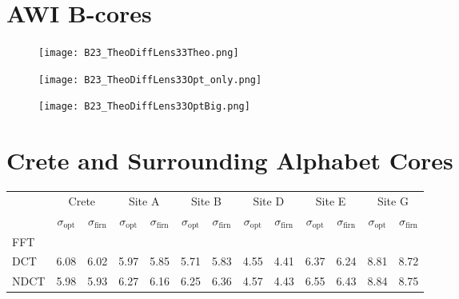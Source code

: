 \documentclass[../../CompleteThesis/Complete_1stDraft]{subfiles}
\begin{document}
\section[AWI B-cores]{AWI B-cores}
\label{Sec:Results_AWIBcores}




\begin{figure}[h]
	\centering
	\texttt{[image: B23\_TheoDiffLens33Theo.png]}
	\caption[]{}
	\label{fig:B23_BD_Theo}
\end{figure}

\begin{figure}[h]
	\centering
	\texttt{[image: B23\_TheoDiffLens33Opt\_only.png]}
	\caption[]{}
	\label{fig:B23_BD_OptOnly}
\end{figure}

\begin{figure}[h]
	\centering
	\texttt{[image: B23\_TheoDiffLens33OptBig.png]}
	\caption[]{}
	\label{fig:B23_BD_OptBig}
\end{figure}











\section[Alphabet Cores]{Crete and Surrounding Alphabet Cores}
\label{Sec:Results_AlphabetCores}

\begin{table}[ht]
	\centering
	\begin{tabular}{l||*{6}{c | c||}}
		&
		\multicolumn{2}{c}{Crete} & \multicolumn{2}{c}{Site A} & \multicolumn{2}{c}{Site B} & \multicolumn{2}{c}{Site D} & \multicolumn{2}{c}{Site E} & \multicolumn{2}{c||}{Site G} \\
		&
		$\sigma_{\text{opt}}$ & $\sigma_{\text{firn}}$ & $\sigma_{\text{opt}}$ & $\sigma_{\text{firn}}$ & $\sigma_{\text{opt}}$ & $\sigma_{\text{firn}}$ & $\sigma_{\text{opt}}$ & $\sigma_{\text{firn}}$ & $\sigma_{\text{opt}}$ & $\sigma_{\text{firn}}$ & $\sigma_{\text{opt}}$ & $\sigma_{\text{firn}}$ \\
		
		\hline
		FFT & & & & & & & & & & & & \\ 
		DCT & 6.08 & 6.02 & 5.97 & 5.85 & 5.71 & 5.83 & 4.55 & 4.41 & 6.37 & 6.24 & 8.81 & 8.72 \\
		NDCT & 5.98 & 5.93 & 6.27 & 6.16 & 6.25 & 6.36 & 4.57 & 4.43 & 6.55 & 6.43 & 8.84 & 8.75 \\
	\end{tabular}
\end{table}
\end{document}
